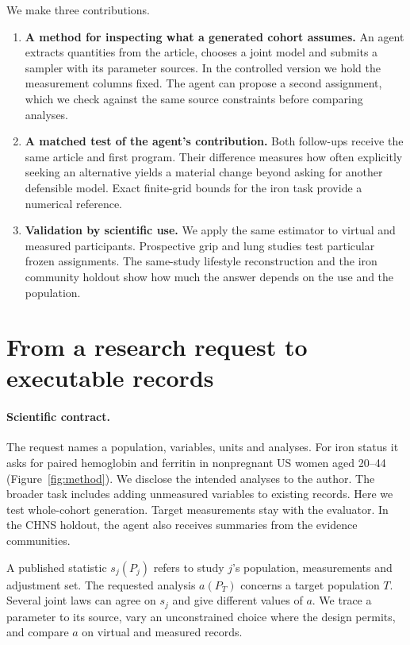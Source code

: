 \documentclass[sigconf,anonymous,review]{acmart}
\begin{document}
We make three contributions.
\begin{enumerate}
\item \textbf{A method for inspecting what a generated cohort assumes.} An agent extracts quantities from the article, chooses a joint model and submits a sampler with its parameter sources. In the controlled version we hold the measurement columns fixed. The agent can propose a second assignment, which we check against the same source constraints before comparing analyses.
\item \textbf{A matched test of the agent's contribution.} Both follow-ups receive the same article and first program. Their difference measures how often explicitly seeking an alternative yields a material change beyond asking for another defensible model. Exact finite-grid bounds for the iron task provide a numerical reference.
\item \textbf{Validation by scientific use.} We apply the same estimator to virtual and measured participants. Prospective grip and lung studies test particular frozen assignments. The same-study lifestyle reconstruction and the iron community holdout show how much the answer depends on the use and the population.
\end{enumerate}

\section{From a research request to executable records}
\label{sec:method}

\paragraph{Scientific contract.}
The request names a population, variables, units and analyses. For iron status it asks for paired hemoglobin and ferritin in nonpregnant US women aged 20--44 (Figure~\ref{fig:method}). We disclose the intended analyses to the author. The broader task includes adding unmeasured variables to existing records. Here we test whole-cohort generation. Target measurements stay with the evaluator. In the CHNS holdout, the agent also receives summaries from the evidence communities.

A published statistic $s_j(P_j)$ refers to study $j$'s population, measurements and adjustment set. The requested analysis $a(P_T)$ concerns a target population $T$. Several joint laws can agree on $s_j$ and give different values of $a$. We trace a parameter to its source, vary an unconstrained choice where the design permits, and compare $a$ on virtual and measured records.
\end{document}
